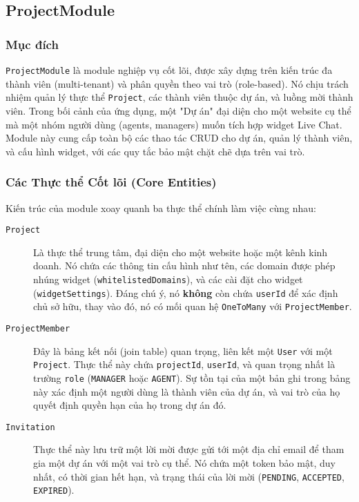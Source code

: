 \subsection{ProjectModule}
\label{subsec:project-module}

\subsubsection{Mục đích}

\texttt{ProjectModule} là module nghiệp vụ cốt lõi, được xây dựng trên kiến trúc đa thành viên (multi-tenant) và phân quyền theo vai trò (role-based). Nó chịu trách nhiệm quản lý thực thể \texttt{Project}, các thành viên thuộc dự án, và luồng mời thành viên. Trong bối cảnh của ứng dụng, một "Dự án" đại diện cho một website cụ thể mà một nhóm người dùng (agents, managers) muốn tích hợp widget Live Chat. Module này cung cấp toàn bộ các thao tác CRUD cho dự án, quản lý thành viên, và cấu hình widget, với các quy tắc bảo mật chặt chẽ dựa trên vai trò.

\subsubsection{Các Thực thể Cốt lõi (Core Entities)}
Kiến trúc của module xoay quanh ba thực thể chính làm việc cùng nhau:
\begin{description}
    \item[\texttt{Project}] Là thực thể trung tâm, đại diện cho một website hoặc một kênh kinh doanh. Nó chứa các thông tin cấu hình như tên, các domain được phép nhúng widget (\texttt{whitelistedDomains}), và các cài đặt cho widget (\texttt{widgetSettings}). Đáng chú ý, nó \textbf{không} còn chứa \texttt{userId} để xác định chủ sở hữu, thay vào đó, nó có mối quan hệ \texttt{OneToMany} với \texttt{ProjectMember}.
    
    \item[\texttt{ProjectMember}] Đây là bảng kết nối (join table) quan trọng, liên kết một \texttt{User} với một \texttt{Project}. Thực thể này chứa \texttt{projectId}, \texttt{userId}, và quan trọng nhất là trường \texttt{role} (\texttt{MANAGER} hoặc \texttt{AGENT}). Sự tồn tại của một bản ghi trong bảng này xác định một người dùng là thành viên của dự án, và vai trò của họ quyết định quyền hạn của họ trong dự án đó.
    
    \item[\texttt{Invitation}] Thực thể này lưu trữ một lời mời được gửi tới một địa chỉ email để tham gia một dự án với một vai trò cụ thể. Nó chứa một token bảo mật, duy nhất, có thời gian hết hạn, và trạng thái của lời mời (\texttt{PENDING}, \texttt{ACCEPTED}, \texttt{EXPIRED}).
\end{description}

